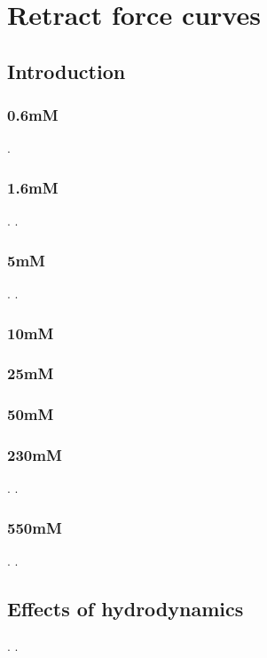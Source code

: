 \chapter{Retract force curves}

\section{Introduction}

\newpage

\subsection{0.6mM}
\newpage.
\newpage

\subsection{1.6mM}
.
\newpage.
\newpage

\subsection{5mM}
.
\newpage.
\newpage

\subsection{10mM}

\newpage

\subsection{25mM}

\newpage

\subsection{50mM}

\newpage

\subsection{230mM}
.
\newpage.
\newpage

\subsection{550mM}
.
\newpage.
\newpage

\section{Effects of hydrodynamics}
.
\newpage.
\newpage

